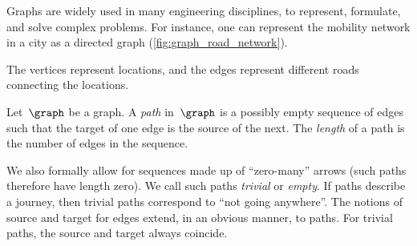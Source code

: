 Graphs are widely used in many engineering disciplines, to represent, formulate, and solve complex problems.
For instance, one can represent the mobility network in a city as a directed graph (\cref{fig:graph_road_network}).

\begin{marginfigure}
    \caption{\label{fig:graph_road_network}}
\end{marginfigure}
The vertices represent locations, and the edges represent different roads connecting the locations.


\begin{definition}[Paths]
    \label{def:path}
    Let~$\graph$ be a graph.
    A \emph{path} in~$\graph$ is a possibly empty sequence of edges such that the target of one edge is the source of the next.
    The \emph{length} of a path is the number of edges in the sequence.
\end{definition}
We also formally allow for sequences made up of ``zero-many'' arrows (such paths therefore have length zero).
We call such paths \emph{trivial} or \emph{empty}.
If paths describe a journey, then trivial paths correspond to ``not going anywhere''.
The notions of source and target for edges extend, in an obvious manner, to paths.
For trivial paths, the source and target always coincide.
